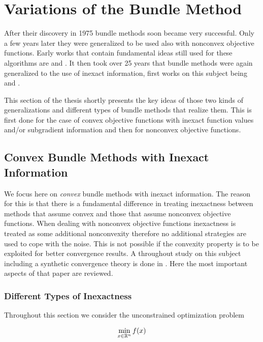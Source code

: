 \section{Variations of the Bundle Method}
\label{sec_simplifications}

After their discovery in 1975 bundle methods soon became very successful. Only a few years later they were generalized to be used also with nonconvex objective functions. Early works that contain fundamental ideas still used for these algorithms are \cite{Mifflin1982} and \cite{Kiwiel1985}.
It then took over 25 years that bundle methods were again generalized to the use of inexact information, first works on this subject being \cite{Hintermueller2001,Kiwiel2006} and \cite{Solodov2003}.

This section of the thesis shortly presents the key ideas of those two kinds of generalizations and different types of bundle methods that realize them.
This is first done for the case of convex objective functions with inexact function values and/or subgradient information and then for nonconvex objective functions. 

\subsection{Convex Bundle Methods with Inexact Information}

We focus here on \emph{convex} bundle methods with inexact information. The reason for this is that there is a fundamental difference in treating inexactness between methods that assume convex and those that assume nonconvex objective functions.
When dealing with nonconvex objective functions inexactness is treated as some additional nonconvexity therefore no additional strategies are used to cope with the noise. This is not possible if the convexity property is to be exploited for better convergence results.
A throughout study on this subject including a synthetic convergence theory is done in \cite{Oliveira2014}. Here the most important aspects %
of that paper are reviewed.

\subsubsection{Different Types of Inexactness}

Throughout this section we consider the unconstrained optimization problem

\begin{equation}
	\min_{x \in \mathbb{R}^n} f(x)
\label{opt_prob_conv}
\end{equation}

